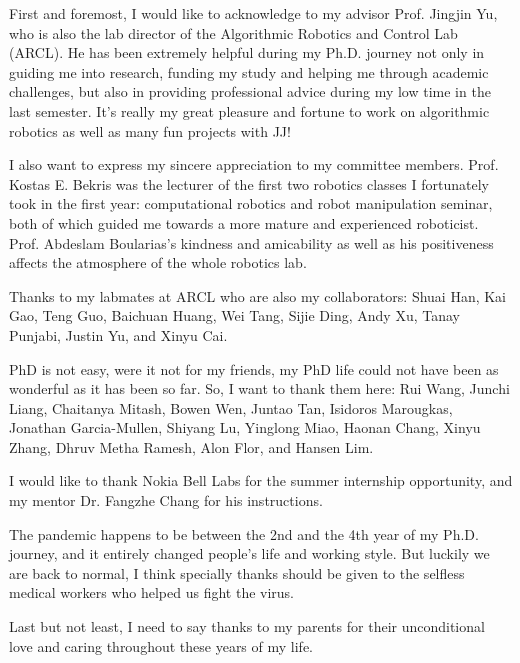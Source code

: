 
\begin{acknowledgments}
First and foremost, I would like to acknowledge to my advisor Prof. Jingjin Yu, 
who is also the lab director of the Algorithmic Robotics and Control Lab (ARCL). 
He has been extremely helpful during my Ph.D. journey 
not only in guiding me into research, funding my study and helping me through academic challenges, 
but also in providing professional advice during my low time in the last semester. 
It's really my great pleasure and fortune to work on algorithmic robotics 
as well as many fun projects with JJ! 

I also want to express my sincere appreciation to my committee members. 
Prof. Kostas E. Bekris was the lecturer of the first two robotics classes I fortunately took in the first year: 
computational robotics and robot manipulation seminar, both of which guided me 
towards a more mature and experienced roboticist. 
Prof. Abdeslam Boularias's kindness and amicability as well as his positiveness affects
the atmosphere of the whole robotics lab.

Thanks to my labmates at ARCL who are also my collaborators: Shuai Han, 
Kai Gao, Teng Guo, Baichuan Huang, Wei Tang, Sijie Ding, Andy Xu, Tanay Punjabi, 
Justin Yu, and Xinyu Cai. 

PhD is not easy, were it not for my friends, my PhD life 
could not have been as wonderful as it has been so far. 
So, I want to thank them here: Rui Wang, Junchi Liang, Chaitanya Mitash, Bowen Wen, Juntao Tan, 
Isidoros Marougkas, Jonathan Garcia-Mullen, Shiyang Lu, Yinglong Miao, Haonan Chang, Xinyu Zhang, 
Dhruv Metha Ramesh, Alon Flor, and Hansen Lim. 

I would like to thank Nokia Bell Labs for the summer internship opportunity,
and my mentor Dr. Fangzhe Chang for his instructions.

The pandemic happens to be between the 2nd and the 4th year of my Ph.D. journey, 
and it entirely changed people's life and working style. 
But luckily we are back to normal, I think specially thanks should be given to the 
selfless medical workers who helped us fight the virus. 

Last but not least, I need to say thanks to my parents for their unconditional love 
and caring throughout these years of my life. 

\end{acknowledgments}
